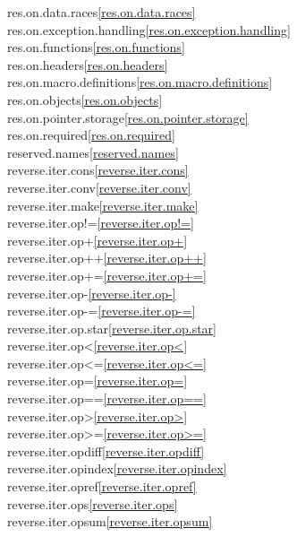 \begin{multicols}{2}
res.on.data.races\quad\ref{res.on.data.races}\\
res.on.exception.handling\quad\ref{res.on.exception.handling}\\
res.on.functions\quad\ref{res.on.functions}\\
res.on.headers\quad\ref{res.on.headers}\\
res.on.macro.definitions\quad\ref{res.on.macro.definitions}\\
res.on.objects\quad\ref{res.on.objects}\\
res.on.pointer.storage\quad\ref{res.on.pointer.storage}\\
res.on.required\quad\ref{res.on.required}\\
reserved.names\quad\ref{reserved.names}\\
reverse.iter.cons\quad\ref{reverse.iter.cons}\\
reverse.iter.conv\quad\ref{reverse.iter.conv}\\
reverse.iter.make\quad\ref{reverse.iter.make}\\
reverse.iter.op!=\quad\ref{reverse.iter.op!=}\\
reverse.iter.op+\quad\ref{reverse.iter.op+}\\
reverse.iter.op++\quad\ref{reverse.iter.op++}\\
reverse.iter.op+=\quad\ref{reverse.iter.op+=}\\
reverse.iter.op-\quad\ref{reverse.iter.op-}\\
reverse.iter.op-=\quad\ref{reverse.iter.op-=}\\
reverse.iter.op.star\quad\ref{reverse.iter.op.star}\\
reverse.iter.op<\quad\ref{reverse.iter.op<}\\
reverse.iter.op<=\quad\ref{reverse.iter.op<=}\\
reverse.iter.op=\quad\ref{reverse.iter.op=}\\
reverse.iter.op==\quad\ref{reverse.iter.op==}\\
reverse.iter.op>\quad\ref{reverse.iter.op>}\\
reverse.iter.op>=\quad\ref{reverse.iter.op>=}\\
reverse.iter.opdiff\quad\ref{reverse.iter.opdiff}\\
reverse.iter.opindex\quad\ref{reverse.iter.opindex}\\
reverse.iter.opref\quad\ref{reverse.iter.opref}\\
reverse.iter.ops\quad\ref{reverse.iter.ops}\\
reverse.iter.opsum\quad\ref{reverse.iter.opsum}\\

\end{multicols}
